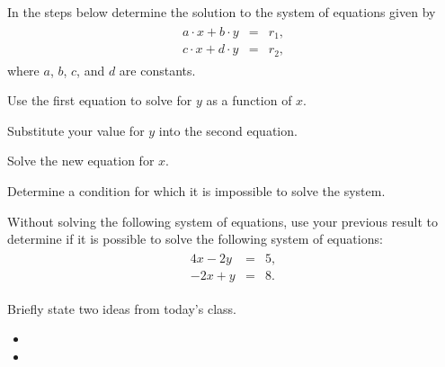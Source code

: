 \begin{problem}
\item In the steps below determine the solution to the system of equations given by
\begin{eqnarray*}
  \begin{array}{lcl}
    a \cdot x + b \cdot y & = & r_1, \\
    c \cdot x + d \cdot y & = & r_2,
  \end{array}
\end{eqnarray*}
where $a$, $b$, $c$, and $d$ are constants.
\begin{subproblem}
  \item Use the first equation to solve for $y$ as a function of $x$.
    \vfill
  \item Substitute your value for $y$ into the second equation.
    \vfill
  \item Solve the new equation for $x$.
    \vfill
  \item Determine a condition for which it is impossible to solve the system.
    \vfill
\end{subproblem}

  \clearpage

\item Without solving the following system of equations, use your previous result to determine if it is possible to solve the following system of equations:
\begin{eqnarray*}
  \begin{array}{lcl}
     4x - 2y & = & 5, \\
    -2x + y & = & 8.
  \end{array}
\end{eqnarray*}

\end{problem}


\postClass

\begin{problem}
\item Briefly state two ideas from today's class.
  \begin{itemize}
  \item
  \item
  \end{itemize}
\item
  \begin{subproblem}
    \item
  \end{subproblem}
\end{problem}


